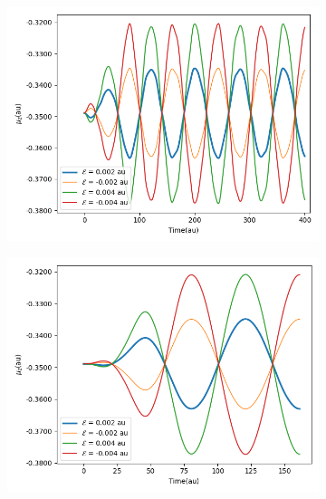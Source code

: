 \begin{figure}
     \centering
     \begin{subfigure}{0.47\textwidth}
         \centering
         \includegraphics[width=\textwidth]{ch4/Figs/3-1.png}
     \end{subfigure}
     \hfill
     \begin{subfigure}{0.47\textwidth}
         \centering
         \includegraphics[width=\textwidth]{ch4/Figs/3-4.png}
     \end{subfigure}
     \vfill
     \begin{subfigure}{0.47\textwidth}
         \centering

\end{subfigure}
\end{figure}
